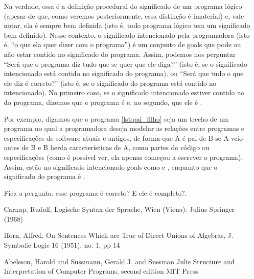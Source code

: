   Na verdade, essa é a definição procedural do significado de um programa lógico (apesar de que, como veremos posteriormente, essa distinção é imaterial) e, vale notar, ela é sempre bem definida (isto é, todo programa lógico tem um significado bem definido). Nesse contexto, o significado intencionado pela programadora (isto é, ``o que ela quer dizer com o programa'') é um conjunto de goals que pode ou não estar contido no significado do programa. Assim, podemos nos perguntar ``Será que o
  programa diz tudo que se quer que ele diga?'' (isto é, se o significado intencionado está contido no significado do programa), ou ``Será que tudo o que ele diz é correto?'' (isto é, se o significado do programa está contido no intencionado). No primeiro caso, se o significado intencionado estiver contido no do programa, dizemos que o programa é  e, no segundo, que ele é .

  Por exemplo, digamos que o programa \ref{lst:pai_filho}  seja um trecho de um programa no qual a programadora deseja modelar as relações entre programas e especificações de software atuais e antigos, de forma que A é pai de B se A veio antes de B e B herda características de A, como partes do código ou especificações (como é possível ver, ela apenas começou a escrever o programa). Assim, estão no significado intencionado goals como  e , enquanto que o
  significado do programa é .

  Fica a pergunta: esse programa é correto? E ele é completo?.


  \begin{thebibliography}{1}

     Carnap, Rudolf,
     Logische Syntax der Sprache,
     Wien (Viena): Julius Springer (1968)

     Horn, Alfred,
     On Sentences Which are True of Direct Unions of Algebras,
     J. Symbolic Logic 16 (1951),
     no. 1,
     pp 14

     Abelsson, Harold and Sussmann, Gerald J. and Sussman Julie
     Structure and Interpretation of Computer Programs, second edition
     MIT Press

  \end{thebibliography}

%
